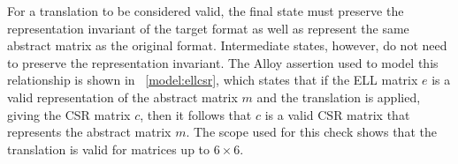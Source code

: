 
For a translation to be considered valid, the final state must preserve the representation invariant of the target format as well as represent the same abstract matrix as the original format.  Intermediate states, however, do not need to preserve the representation invariant.  The Alloy assertion used to model this relationship is shown in \figurename~\ref{model:ellcsr}, which states that if the ELL matrix $e$ is a valid representation of the abstract matrix $m$ and the translation is applied, giving the CSR matrix $c$, then it follows that $c$ is a valid CSR matrix that represents the abstract matrix $m$.  The scope used for this check shows that the translation is valid for matrices up to $6\times6$.



